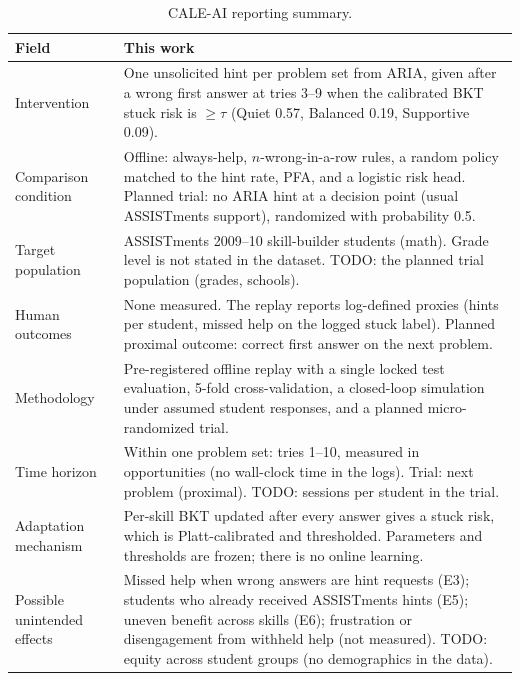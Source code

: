 \begin{table}[t]
\centering
\small
\setlength{\tabcolsep}{3pt}
\begin{tabular}{p{}p{}}
\toprule
Field & This work \\
\midrule
Intervention & One unsolicited hint per problem set from ARIA, given after a wrong first answer at tries 3--9 when the calibrated BKT stuck risk is $\ge\tau$ (Quiet 0.57, Balanced 0.19, Supportive 0.09). \\
Comparison condition & Offline: always-help, $n$-wrong-in-a-row rules, a random policy matched to the hint rate, PFA, and a logistic risk head. Planned trial: no ARIA hint at a decision point (usual ASSISTments support), randomized with probability 0.5. \\
Target population & ASSISTments 2009--10 skill-builder students (math). Grade level is not stated in the dataset. TODO: the planned trial population (grades, schools). \\
Human outcomes & None measured. The replay reports log-defined proxies (hints per student, missed help on the logged stuck label). Planned proximal outcome: correct first answer on the next problem. \\
Methodology & Pre-registered offline replay with a single locked test evaluation, 5-fold cross-validation, a closed-loop simulation under assumed student responses, and a planned micro-randomized trial. \\
Time horizon & Within one problem set: tries 1--10, measured in opportunities (no wall-clock time in the logs). Trial: next problem (proximal). TODO: sessions per student in the trial. \\
Adaptation mechanism & Per-skill BKT updated after every answer gives a stuck risk, which is Platt-calibrated and thresholded. Parameters and thresholds are frozen; there is no online learning. \\
Possible unintended effects & Missed help when wrong answers are hint requests (E3); students who already received ASSISTments hints (E5); uneven benefit across skills (E6); frustration or disengagement from withheld help (not measured). TODO: equity across student groups (no demographics in the data). \\
\bottomrule
\end{tabular}
\caption{CALE-AI reporting summary.}
\label{tab:reporting}
\end{table}
